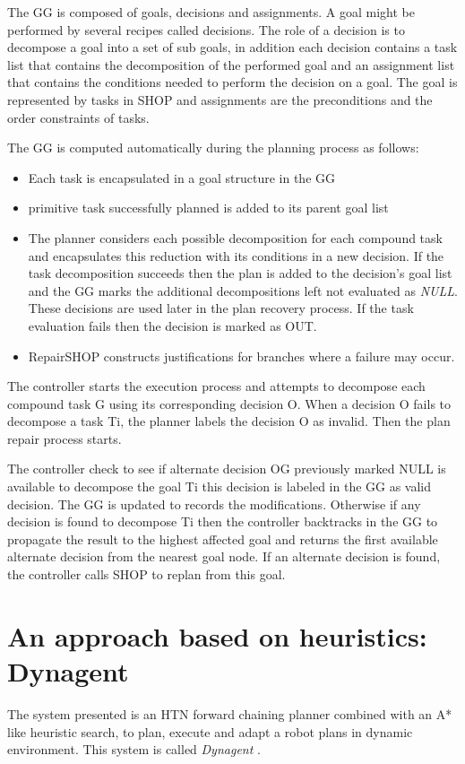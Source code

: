 The GG is composed of goals, decisions and assignments. A goal might be performed by several recipes called decisions. The role of a decision is to decompose a goal into a set of sub goals, in addition each decision contains a task list that contains the decomposition of the performed goal and an assignment list that contains the conditions needed to perform the decision on a goal. The goal is represented by tasks in SHOP and assignments are the preconditions and the order constraints of tasks.

The GG is computed automatically during the planning process as follows: 
\begin{itemize}
\item	Each task is encapsulated in a goal structure in the GG
\item primitive task successfully planned is added to its parent  goal list
\item	The planner considers each possible decomposition for each compound task and encapsulates this reduction with its conditions in a new decision. If the task decomposition succeeds then the plan is added to the decision’s goal list and the GG marks the additional decompositions left not evaluated as \textit{NULL}. These decisions are used later in the plan recovery process. If the task evaluation fails then the decision is marked as OUT.
\item	RepairSHOP constructs justifications for branches where a failure may occur.
\end{itemize}
The controller starts the execution process and attempts to decompose each compound task G using its corresponding decision O. When a decision O fails to decompose a task Ti, the planner labels the decision O as invalid. Then the plan repair process starts. 


The controller check to see if alternate decision OG previously marked NULL is available to decompose the goal Ti this decision is labeled in the GG as valid decision. The GG is updated to records the modifications. Otherwise if any decision is found to decompose Ti then the controller backtracks in the GG to propagate the result to the highest affected goal and returns the first available alternate decision from the nearest goal node. If an alternate decision is found, the controller calls SHOP to replan from this goal. 


 
\section{An approach based on heuristics: Dynagent}
The system presented is an HTN forward chaining planner combined with an A* like heuristic search, to plan, execute and adapt a robot plans in dynamic environment. This system is called \textit{Dynagent} \cite{hayashi2006dynagent}.


